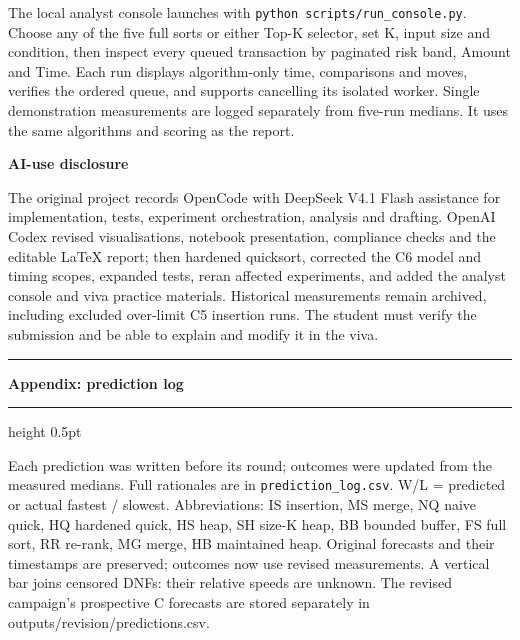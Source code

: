 \documentclass[10pt,a4paper]{article}
\newcommand{\appendixheading}[1]{%
  \par\addvspace{6pt}%
  \noindent
  {\color{teal}\rule[-2.4pt]{3pt}{14pt}}\hspace{6pt}%
  {\fontsize{12.6}{15}\selectfont\bfseries #1}%
  \par\vspace{1.6pt}%
  {\color{teal!40}\hrule height 0.5pt}%
  \par\vspace{3pt}%
}
\newcommand{\subheading}[1]{%
  \par\addvspace{3pt}%
  \noindent{\color{teal}\rule[-1.4pt]{2.6pt}{9pt}}\hspace{5pt}%
  {\fontsize{9.2}{11}\selectfont\bfseries #1}%
  \par\vspace{1pt}%
}
\begin{document}
The local analyst console launches with
\texttt{python scripts/run\_\allowbreak{}console.py}. Choose any of the five
full sorts or either Top-K selector, set K, input size and condition, then
inspect every queued transaction by paginated risk band, Amount and Time. Each
run displays algorithm-only time, comparisons and moves, verifies the ordered
queue, and supports cancelling its isolated worker. Single demonstration
measurements are logged separately from five-run medians. It uses the same
algorithms and scoring as the report.\par

\subheading{AI-use disclosure}

The original project records OpenCode with DeepSeek V4.1 Flash assistance for
implementation, tests, experiment orchestration, analysis and drafting. OpenAI
Codex revised visualisations, notebook presentation, compliance checks and the
editable LaTeX report; then hardened quicksort, corrected the C6 model and
timing scopes, expanded tests, reran affected experiments, and added the analyst
console and viva practice materials. Historical measurements remain archived,
including excluded over-limit C5 insertion runs. The student must verify the
submission and be able to explain and modify it in the viva.\par

\newpage
\fontsize{8.8}{10.6}\selectfont

\appendixheading{Appendix: prediction log}

Each prediction was written before its round; outcomes were updated from the
measured medians. Full rationales are in
\texttt{prediction\_\allowbreak{}log.csv}. W/L = predicted or actual fastest /
slowest. Abbreviations: IS insertion, MS merge, NQ naive quick, HQ hardened
quick, HS heap, SH size-K heap, BB bounded buffer, FS full sort, RR re-rank, MG
merge, HB maintained heap. Original forecasts and their timestamps are
preserved; outcomes now use revised measurements. A vertical bar joins censored
DNFs: their relative speeds are unknown. The revised campaign's prospective C
forecasts are stored separately in outputs/revision/predictions.csv.\par
\end{document}
